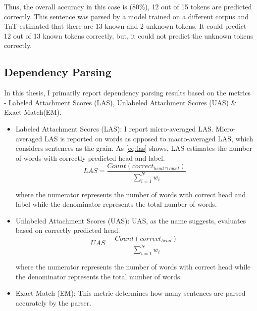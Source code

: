 Thus, the overall accuracy in this case is (80\%), 12 out of 15 tokens are predicted correctly. This sentence was parsed by a model trained on a different corpus and TnT estimated that there are 13 known and 2 unknown tokens. It could predict 12 out of 13 known tokens correctly, but, it could not predict the unknown tokens correctly.

\subsection{Dependency Parsing}

In this thesis, I primarily report dependency parsing results based on the metrics - Labeled Attachment Scores (LAS), Unlabeled Attachment Scores (UAS) \& Exact Match(EM).

    \begin{itemize}
        \item Labeled Attachment Scores (LAS): I report micro-averaged LAS. Micro-averaged LAS is reported on words as opposed to macro-averaged LAS, which considers sentences as the grain.  As \ref{eq:las} shows, LAS estimates the number of words with correctly predicted head and label.
        \begin{equation} \label{eq:las}
            LAS = \frac{Count({correct_{head \cap label}})}{\sum_{i=1}^{N} w_i}
        \end{equation}
        
        where the numerator represents the number of words with correct head and label while the denominator represents the total number of words. 
        
        \item Unlabeled Attachment Scores (UAS): UAS, as the name suggests, evaluates based on correctly predicted head. 
        \begin{equation} \label{eq:uas}
            UAS = \frac{Count({correct_{head}})}{\sum_{i=1}^{N} w_i}
        \end{equation}
        
        where the numerator represents the number of words with correct head while the denominator represents the total number of words. 
        
        \item Exact Match (EM): This metric determines how many sentences are parsed accurately by the parser.
        
    \end{itemize}

